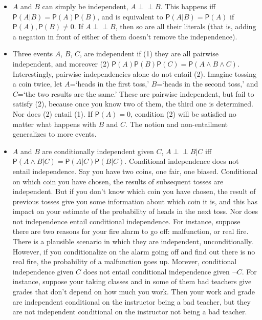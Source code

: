 \documentclass[
  10pt,
  dvipsnames,enabledeprecatedfontcommands]{scrartcl}
\newcommand{\indep}{\!\perp \!\!\! \perp\!}
\newcommand{\n}{\neg}
\newcommand{\et}{\wedge}
\newcommand{\pr}[1]{\mathsf{P}(#1)}
\begin{document}
\begin{itemize}
\item
  \(A\) and \(B\) can simply be independent, \(A \indep B\). This
  happens iff \(\pr{A \vert B} = \pr{A}\pr{B}\), and is equivalent to
  \(\pr{A\vert B} = \pr{A}\) if \(\pr{A}, \pr{B} \neq 0\). If
  \(A\indep B\), then so are all their literals (that is, adding a
  negation in front of either of them doesn't remove the independence).
\item
  Three events \(A\), \(B\), \(C\), are independent if (1) they are all
  pairwise independent, and moreover (2)
  \(\pr{A}\pr{B}\pr{C} = \pr{A \et B \et C}\). Interestingly, pairwise
  independencies alone do not entail (2). Imagine tossing a coin twice,
  let \(A\)=`heads in the first toss,' \(B\)=`heads in the second toss,'
  and \(C\)=`the two results are the same.' These are pairwise
  independent, but fail to satisfy (2), because once you know two of
  them, the third one is determined. Nor does (2) entail (1). If
  \(\pr{A}=0\), condition (2) will be satisfied no matter what happens
  with \(B\) and \(C\). The notion and non-entailment generalizes to
  more events.
\item
  \(A\) and \(B\) are conditionally independent given \(C\),
  \(A\indep B \vert C\) iff
  \(\pr{A\et B \vert C} = \pr{A\vert C }\pr{B \vert C}\). Conditional
  independence does not entail independence. Say you have two coins, one
  fair, one biased. Conditional on which coin you have chosen, the
  results of subsequent tosses are independent. But if you don't know
  which coin you have chosen, the result of previous tosses give you
  some information about which coin it is, and this has impact on your
  estimate of the probability of heads in the next toss. Nor does not
  independence entail conditional independence. For instance, suppose
  there are two reasons for your fire alarm to go off: malfunction, or
  real fire. There is a plausible scenario in which they are
  independent, unconditionally. However, if you conditionalize on the
  alarm going off and find out there is no real fire, the probability of
  a malfunction goes up. Morever, conditional independence given \(C\)
  does not entail conditional independence given \(\n C\). For instance,
  suppose your taking classes and in some of them bad teachers give
  grades that don't depend on how much you work. Then your work and
  grade are independent conditional on the instructor being a bad
  teacher, but they are not independent conditional on the instructor
  not being a bad teacher.
\end{itemize}
\end{document}
